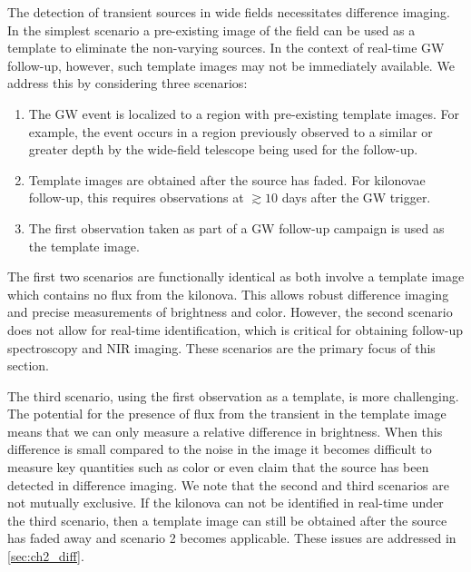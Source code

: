 The detection of transient sources in wide fields necessitates difference imaging. In the simplest scenario a pre-existing image of the field can be used as a template to eliminate the non-varying sources. In the context of real-time GW follow-up, however, such template images may not be immediately available. We address this by considering three scenarios:
\begin{enumerate}
\item The GW event is localized to a region with pre-existing template images. For example, the event occurs in a region previously observed to a similar or greater depth by the wide-field telescope being used for the follow-up.
\item Template images are obtained after the source has faded. For kilonovae follow-up, this requires observations at $\gtrsim10$ days after the GW trigger.
\item The first observation taken as part of a GW follow-up campaign is used as the template image.
\end{enumerate}

The first two scenarios are functionally identical as both involve a template image which contains no flux from the kilonova. This allows robust difference imaging and precise measurements of brightness and color. However, the second scenario does not allow for real-time identification, which is critical for obtaining follow-up spectroscopy and NIR imaging. These scenarios are the primary focus of this section.

The third scenario, using the first observation as a template, is more challenging. The potential for the presence of flux from the transient in the template image means that we can only measure a relative difference in brightness. When this difference is small compared to the noise in the image it becomes difficult to measure key quantities such as color or even claim that the source has been detected in difference imaging. We note that the second and third scenarios are not mutually exclusive. If the kilonova can not be identified in real-time under the third scenario, then a template image can still be obtained after the source has faded away and scenario 2 becomes applicable. These issues are addressed in \cref{sec:ch2_diff}.

